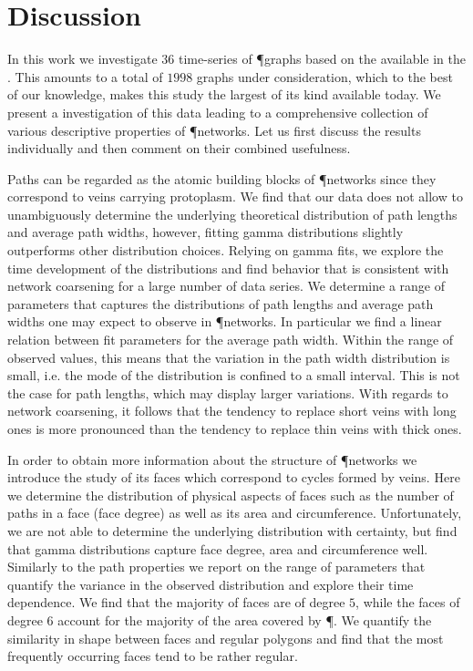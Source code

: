 	\section{Discussion}

			In this work we investigate $36$ time-series of \P graphs based on the \data available in the \SMGR. This amounts to a total of $1998$ graphs under consideration, which to the best of our knowledge, makes this study the largest of its kind available today. We present a investigation of this data leading to a comprehensive collection of various descriptive properties of \P networks. Let us first discuss the results individually and then comment on their combined usefulness.

			Paths can be regarded as the atomic building blocks of \P networks since they correspond to veins carrying protoplasm. We find that our data does not allow to unambiguously determine the underlying theoretical distribution of path lengths and average path widths, however, fitting gamma distributions slightly outperforms other distribution choices. Relying on gamma fits, we explore the time development of the distributions and find behavior that is consistent with network coarsening for a large number of data series. We determine a range of parameters that captures the distributions of path lengths and average path widths one may expect to observe in \P networks. In particular we find a linear relation between fit parameters for the average path width. Within the range of observed values, this means that the variation in the path width distribution is small, i.e. the mode of the distribution is confined to a small interval. This is not the case for path lengths, which may display larger variations. With regards to network coarsening, it follows that the tendency to replace short veins with long ones is more pronounced than the tendency to replace thin veins with thick ones.

			In order to obtain more information about the structure of \P networks we introduce the study of its faces which correspond to cycles formed by veins.	Here we determine the distribution of physical aspects of faces such as the number of paths in a face (face degree) as well as its area and circumference. Unfortunately, we are not able to determine the underlying distribution with certainty, but find that gamma distributions capture face degree, area and circumference well. Similarly to the path properties we report on the range of parameters that quantify the variance in the observed distribution and explore their time dependence. We find that the majority of faces are of degree $5$, while the faces of degree $6$ account for the majority of the area covered by \P. We quantify the similarity in shape between faces and regular polygons and find that the most frequently occurring faces tend to be rather regular.

